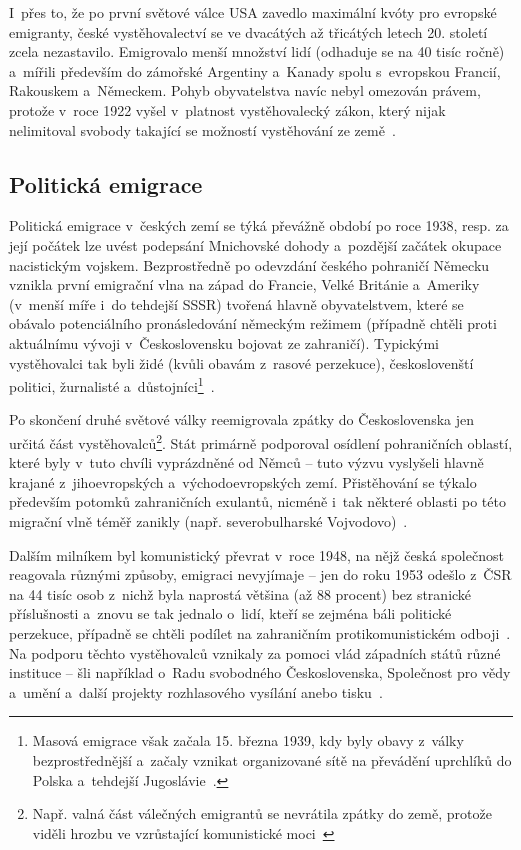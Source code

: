 I~přes to, že po první světové válce USA zavedlo maximální kvóty pro evropské emigranty, české vystěhovalectví se ve dvacátých až třicátých letech 20. století zcela nezastavilo. Emigrovalo menší množství lidí (odhaduje se na 40 tisíc ročně) a~mířili především do zámořské Argentiny a~Kanady spolu s~evropskou Francií, Rakouskem a~Německem. Pohyb obyvatelstva navíc nebyl omezován právem, protože v~roce 1922 vyšel v~platnost vystěhovalecký zákon, který nijak nelimitoval svobody takající se možností vystěhování ze země~\parencite{Vaculik2009b}.

\hypertarget{politickuxe1-emigrace}{%
\subsection{Politická emigrace}\label{politickuxe1-emigrace}}

Politická emigrace v~českých zemí se týká převážně období po roce 1938, resp. za její počátek lze uvést podepsání Mnichovské dohody a~pozdější začátek okupace nacistickým vojskem. Bezprostředně po odevzdání českého pohraničí Německu vznikla první emigrační vlna na západ do Francie, Velké Británie a~Ameriky (v~menší míře i~do tehdejší SSSR) tvořená hlavně obyvatelstvem, které se obávalo potenciálního pronásledování německým režimem (případně chtěli proti aktuálnímu vývoji v~Československu bojovat ze zahraničí). Typickými vystěhovalci tak byli židé (kvůli obavám z~rasové perzekuce), českoslovenští politici, žurnalisté a~důstojníci\footnote{Masová emigrace však začala 15. března 1939, kdy byly obavy z~války bezprostřednější a~začaly vznikat organizované sítě na převádění uprchlíků do Polska a~tehdejší Jugoslávie~\parencite{Vaculik2002}.}~\parencite{Nespor2005}.

Po skončení druhé světové války reemigrovala zpátky do Československa jen určitá část vystěhovalců\footnote{Např. valná část válečných emigrantů se nevrátila zpátky do země, protože viděli hrozbu ve vzrůstající komunistické moci~\parencite{Vaculik2009a}}. Stát primárně podporoval osídlení pohraničních oblastí, které byly v~tuto chvíli vyprázdněné od Němců -- tuto výzvu vyslyšeli hlavně krajané z~jihoevropských a~východoevropských zemí. Přistěhování se týkalo především potomků zahraničních exulantů, nicméně i~tak některé oblasti po této migrační vlně téměř zanikly (např. severobulharské Vojvodovo)~\parencite{Nespor2005}.

Dalším milníkem byl komunistický převrat v~roce 1948, na nějž česká společnost reagovala různými způsoby, emigraci nevyjímaje -- jen do roku 1953 odešlo z~ČSR na 44 tisíc osob z~nichž byla naprostá většina (až 88 procent) bez stranické příslušnosti a~znovu se tak jednalo o~lidí, kteří se zejména báli politické perzekuce, případně se chtěli podílet na zahraničním protikomunistickém odboji~\parencite{Vaculik2002}. Na podporu těchto vystěhovalců vznikaly za pomoci vlád západních států různé instituce -- šli například o~Radu svobodného Československa, Společnost pro vědy a~umění a~další projekty rozhlasového vysílání anebo tisku~\parencite{Nespor2005}.

